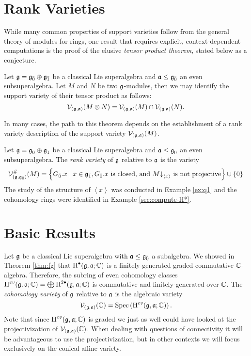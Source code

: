 \section{Rank Varieties}
\label{sec:rank-varieties}

While many common properties of support varieties follow from the general theory of modules for rings, one result that requires explicit, context-dependent computations is the proof of the elusive \emph{tensor product theorem}, stated below as a conjecture.

\begin{conjecture}
  \label{conj:tpt}
  Let $\mathfrak{g} = {\mathfrak{g}}_{\bar{0}} \oplus {\mathfrak{g}}_{\bar{1}}$ be a classical Lie superalgebra and $\mathfrak{a} \leq {\mathfrak{g}}_{\bar{0}}$ an even subsuperalgebra. Let $M$ and $N$ be two $\mathfrak{g}$-modules, then we may identify the support variety of their tensor product as follows:
  \[
    \mathcal{V}_{(\mathfrak{g},\mathfrak{a})}(M \otimes N) = \mathcal{V}_{(\mathfrak{g},\mathfrak{a})}(M) \cap \mathcal{V}_{(\mathfrak{g},\mathfrak{a})}(N).
  \]
\end{conjecture}

In many cases, the path to this theorem depends on the establishment of a rank variety description of the support variety $\mathcal{V}_{(\mathfrak{g},\mathfrak{a})}(M)$.

\begin{definition}
  \label{def:rank-variety}
  Let $\mathfrak{g} = {\mathfrak{g}}_{\bar{0}} \oplus {\mathfrak{g}}_{\bar{1}}$ be a classical Lie superalgebra and $\mathfrak{a} \leq {\mathfrak{g}}_{\bar{0}}$ an even subsuperalgebra. The \emph{rank variety} of $\mathfrak{g}$ relative to $\mathfrak{a}$ is the variety
  \[
    \mathcal{V}_{(\mathfrak{g},{\mathfrak{g}}_{\bar{0}})}^\#(M) = \left\{ {G}_{\bar{0}}.x \mid x \in {\mathfrak{g}}_{\bar{1}}, {G}_{\bar{0}}.x \text{ is closed, and } M\mathord{\downarrow}_{\left<x\right>}\text{ is not projective}  \right\} \cup \{0\}
  \]
  The study of the structure of $\left<x\right>$ was conducted in Example \ref{ex:q1} and the cohomology rings were identified in Example \ref{sec:compute-H*}. 
\end{definition}

\section{Basic Results}

Let $\mathfrak{g}$ be a classical Lie superalgebra with $\mathfrak{a} \leq {\mathfrak{g}}_{\bar{0}}$ a subalgebra. We showed in Theorem \ref{thm:fg} that $\operatorname{H}^\bullet(\mathfrak{g},\mathfrak{a};\mathbb{C})$ is a finitely-generated graded-commutative $\mathbb{C}$-algebra. Therefore, the subring of even cohomology classes $\operatorname{H}^{ev}(\mathfrak{g},\mathfrak{a};\mathbb{C}) = \bigoplus \operatorname{H}^{2\bullet}(\mathfrak{g},\mathfrak{a};\mathbb{C})$ is commutative and finitely-generated over $\mathbb{C}$. The \textit{cohomology variety} of $\mathfrak{g}$ relative to $\mathfrak{a}$ is the algebraic variety
\[
  \mathcal{V}_{(\mathfrak{g},\mathfrak{a})}(\mathbb{C}) = \operatorname{Spec}\left(\operatorname{H}^{ev}(\mathfrak{g},\mathfrak{a};\mathbb{C})\right).
\]
Note that since $\operatorname{H}^{ev}(\mathfrak{g},\mathfrak{a};\mathbb{C})$ is graded we just as well could have looked at the projectivization of $\mathcal{V}_{(\mathfrak{g},\mathfrak{a})}(\mathbb{C})$. When dealing with questions of connectivity it will be advantageous to use the projectivization, but in other contexts we will focus exclusively on the conical affine variety.

